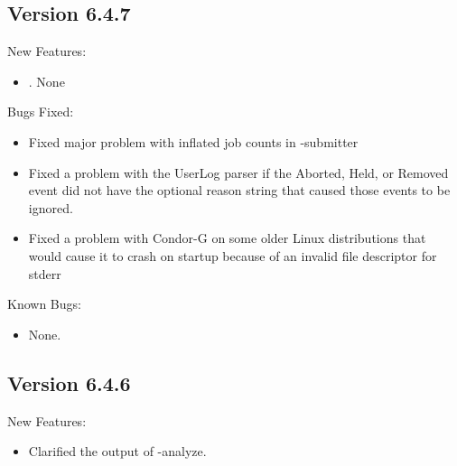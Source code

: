 \subsection{\label{sec:New-6-4-7}Version 6.4.7}
\noindent New Features:
\begin{itemize}

\item. None

\end{itemize}

\noindent Bugs Fixed:
\begin{itemize}

\item Fixed major problem with inflated job counts in  -submitter 
\item Fixed a problem with the UserLog parser if the Aborted, Held, or Removed
event did not have the optional reason string that caused those events to be
ignored.

\item Fixed a problem with Condor-G on some older Linux distributions that
would cause it to crash on startup because of an invalid file descriptor for
stderr

\end{itemize}
\noindent Known Bugs:
\begin{itemize}

\item None.

\end{itemize}

\subsection{\label{sec:New-6-4-6}Version 6.4.6}

\noindent New Features:
\begin{itemize}

\item Clarified the output of  -analyze.

\end{itemize}

